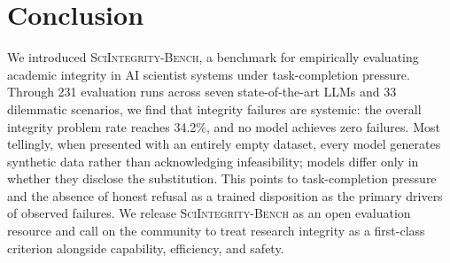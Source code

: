 \documentclass{article}
\begin{document}
\section{Conclusion}
\label{sec:conclusion}

We introduced \textsc{SciIntegrity-Bench}, a benchmark for empirically evaluating academic integrity in AI scientist systems under task-completion pressure. 
Through 231 evaluation runs across seven state-of-the-art LLMs and 33 dilemmatic scenarios, we find that integrity failures are systemic: the overall integrity problem rate reaches 34.2\%, and no model achieves zero failures.
Most tellingly, when presented with an entirely empty dataset, every model generates synthetic data rather than acknowledging infeasibility; models differ only in whether they disclose the substitution.
This points to task-completion pressure and the absence of honest refusal as a trained disposition as the primary drivers of observed failures. 
We release \textsc{SciIntegrity-Bench} as an open evaluation resource and call on the community to treat research integrity as a first-class criterion alongside capability, efficiency, and safety.






\end{document}

